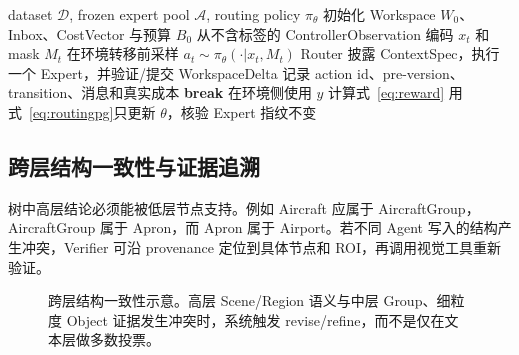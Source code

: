 \documentclass[10pt,a4paper,twocolumn]{ctexart}
\newcommand{\agentset}{\mathcal{A}}
\begin{document}
\begin{algorithm}[t]
\caption{LearnedRoutingPolicy 训练流程（简化）}
\label{alg:train}
\begin{algorithmic}[1]
\Require dataset $\mathcal D$, frozen expert pool $\agentset$, routing policy $\pi_\theta$
  \State 初始化 Workspace $W_0$、Inbox、CostVector 与预算 $B_0$
    \State 从不含标签的 ControllerObservation 编码 $x_t$ 和 mask $M_t$
    \State 在环境转移前采样 $a_t\sim\pi_\theta(\cdot|x_t,M_t)$
    \State Router 披露 ContextSpec，执行一个 Expert，并验证/提交 WorkspaceDelta
    \State 记录 action id、pre-version、transition、消息和真实成本
     \State \textbf{break} \EndIf
  \EndFor
  \State 在环境侧使用 $y$ 计算式~\eqref{eq:reward}
  \State 用式~\eqref{eq:routingpg}只更新 $\theta$，核验 Expert 指纹不变
\EndFor
\end{algorithmic}
\end{algorithm}

\subsection{跨层结构一致性与证据追溯}
树中高层结论必须能被低层节点支持。例如 Aircraft 应属于 AircraftGroup，AircraftGroup 属于 Apron，而 Apron 属于 Airport。若不同 Agent 写入的结构产生冲突，Verifier 可沿 provenance 定位到具体节点和 ROI，再调用视觉工具重新验证。

\begin{figure}[t]
\centering
{}
\caption{跨层结构一致性示意。高层 Scene/Region 语义与中层 Group、细粒度 Object 证据发生冲突时，系统触发 revise/refine，而不是仅在文本层做多数投票。}
\label{fig:consistency}
\end{figure}
\end{document}

